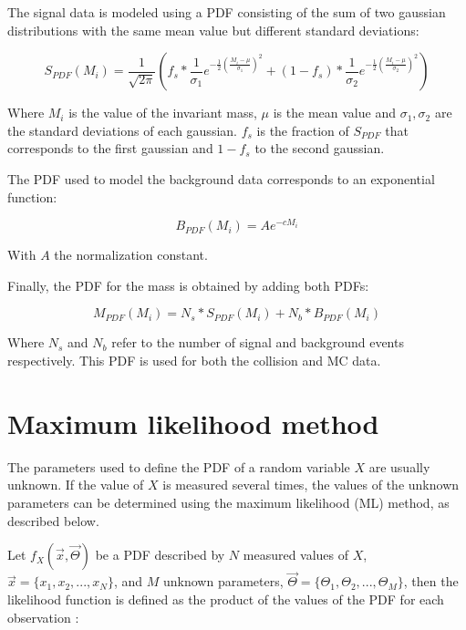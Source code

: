 The signal data is modeled using a PDF consisting of the sum of two gaussian distributions with the same mean value but different standard deviations:

\begin{equation}
S_{PDF}(M_i) = \frac{1}{\sqrt{2\pi}} \left(f_s*\frac{1}{\sigma_1}e^{-\frac{1}{2}\left(\frac{M_i-\mu}{\sigma_1}\right)^2} + (1 - f_s)*\frac{1}{\sigma_2}e^{-\frac{1}{2}\left(\frac{M_i-\mu}{\sigma_2}\right)^2}\right)
\end{equation}

Where $M_i$ is the value of the invariant mass, $\mu$ is the mean value and $\sigma_1, \sigma_2$ are the standard deviations of each gaussian. $f_s$ is the fraction of $S_{PDF}$ that corresponds to the first gaussian and $1-f_s$ to the second gaussian. 

The PDF used to model the background data corresponds to an exponential function:

\begin{equation}
B_{PDF}(M_i) = A e^{-cM_i}
\end{equation}

With $A$ the normalization constant. 

Finally, the PDF for the mass is obtained by adding both PDFs:

\begin{equation}
M_{PDF}(M_i) = N_s*S_{PDF}(M_i)  + N_b*B_{PDF}(M_i)
\label{eq:masspdf}
\end{equation}

Where $N_s$ and $N_b$ refer to the number of signal and background events respectively. This PDF is used for both the collision and MC data.

\section{Maximum likelihood method}
\label{mlmethod}
The parameters used to define the PDF of a random variable $X$ are usually unknown. If the value of $X$ is measured several times, the values of the unknown parameters can be determined using the maximum likelihood (ML) method, as described below.

Let $f_X(\vec{x}, \vec{\Theta} )$ be a PDF described by $N$ measured values of $X$, $\vec{x} = \{x_1, x_2, ..., x_N\}$, and $M$ unknown parameters, $\vec{\Theta} = \{\Theta_1, \Theta_2, ..., \Theta_M \}$, then the likelihood function is defined as the product of the values of the PDF for each observation \cite{bonanomi2021response,vsirca2016probability}:

